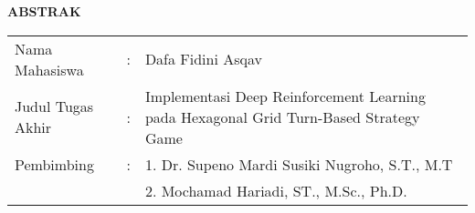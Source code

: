 \begin{center}
  \large\textbf{ABSTRAK}
\end{center}


\vspace{2ex}

\begingroup
  \setlength{\tabcolsep}{0pt}

  \noindent
  \begin{tabularx}{\textwidth}{l >{\centering}m{2em} X}
    Nama Mahasiswa    &:& Dafa Fidini Asqav \\

    Judul Tugas Akhir &:&	Implementasi Deep Reinforcement Learning pada Hexagonal Grid Turn-Based Strategy Game \\

    Pembimbing        &:& 1. Dr. Supeno Mardi Susiki Nugroho, S.T., M.T \\
                      & & 2. Mochamad Hariadi, ST., M.Sc., Ph.D. \\
  \end{tabularx}
\endgroup

